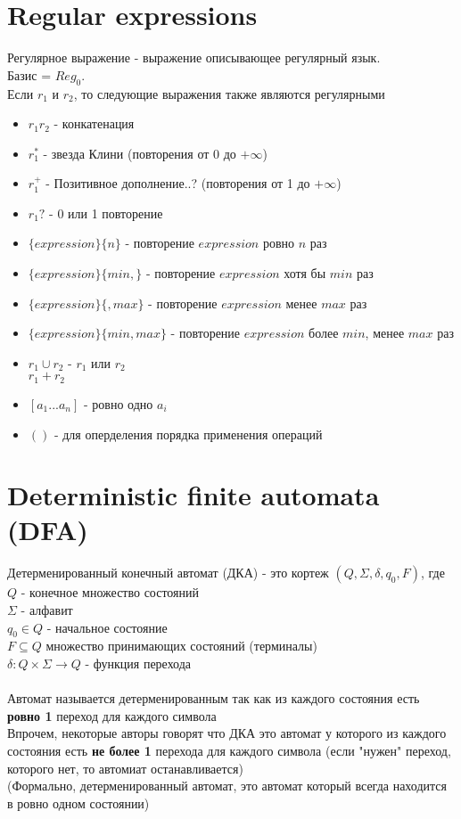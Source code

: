 \documentclass{article}
\begin{document}
	\section{Regular expressions}
	Регулярное выражение - выражение описывающее регулярный язык.\\ 
	Базис = $Reg_0$.\\
	Если $r_1$ и $r_2$, то следующие выражения также являются регулярными\\
	\begin{itemize}
		\item $r_1r_2$ - конкатенация
		\item $r^{*}_1$ - звезда Клини (повторения от 0 до $+\infty$)
		\item $r^{+}_1$ - Позитивное дополнение..? (повторения от 1 до $+\infty$)
		\item $r_1?$ - 0 или 1 повторение
		\item $\{expression\}\{n\}$ - повторение $expression$ ровно $n$ раз
		\item $\{expression\}\{min,\}$ - повторение $expression$ хотя бы $min$ раз
		\item $\{expression\}\{, max\}$ - повторение $expression$ менее $max$ раз
		\item $\{expression\}\{min, max\}$ - повторение $expression$ более $min$, менее $max$ раз
		\item $r_1 \cup r_2$ - $r_1$ или $r_2$\\
				$r_1 + r_2$
		\item $[a_1 ... a_n]$ - ровно одно $a_i$
		\item $()$ - для оперделения порядка применения операций
	\end{itemize}
	
	\section{Deterministic finite automata (DFA)}
	Детерменированный конечный автомат (ДКА) - это кортеж $(Q, \Sigma, \delta, q_0, F)$, где\\
	$Q$ - конечное множество состояний\\
	$\Sigma$ - алфавит\\
	$q_0\in Q$ - начальное состояние\\
	$F\subseteq Q$ множество принимающих состояний (терминалы)\\
	$\delta\colon Q\times\Sigma\to Q$ - функция перехода\\
	\noindent\\
	Автомат называется детерменированным так как из каждого состояния есть \textbf{ровно 1} переход для каждого символа\\
	Впрочем, некоторые авторы говорят что ДКА это автомат у которого из каждого состояния есть \textbf{не более 1} перехода для каждого символа (если "нужен" переход, которого нет, то автомиат останавливается)\\ 
	(Формально, детерменированный автомат, это автомат который всегда находится в ровно одном состоянии)\\
	
\end{document}
